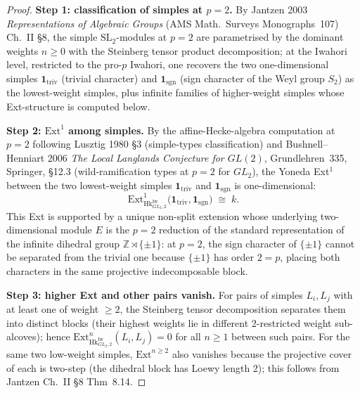 \begin{proof}
\medskip\noindent\textbf{Step 1: classification of simples at \(p=2\).}
By Jantzen 2003 \emph{Representations of Algebraic Groups}
(AMS Math.~Surveys Monographs~107) Ch.~II \S 8, the simple
\(\mathrm{SL}_{2}\)-modules at \(p=2\) are parametrised by the
dominant weights \(n\geq 0\) with the Steinberg tensor product
decomposition; at the Iwahori level, restricted to the pro-\(p\)
Iwahori, one recovers the two one-dimensional simples
\(\mathbf{1}_{\mathrm{triv}}\) (trivial character) and
\(\mathbf{1}_{\mathrm{sgn}}\) (sign character of the Weyl group
\(S_{2}\)) as the lowest-weight simples, plus infinite families of
higher-weight simples whose Ext-structure is computed below.

\medskip\noindent\textbf{Step 2: \(\mathrm{Ext}^{1}\) among simples.} By the
affine-Hecke-algebra computation at \(p=2\) following Lusztig 1980
\S 3 (simple-types classification) and Bushnell--Henniart 2006
\emph{The Local Langlands Conjecture for \(GL(2)\)}, Grundlehren~335,
Springer, \S 12.3 (wild-ramification types at \(p=2\) for \(GL_{2}\)),
the Yoneda Ext\({}^{1}\) between the two lowest-weight simples
\(\mathbf{1}_{\mathrm{triv}}\) and \(\mathbf{1}_{\mathrm{sgn}}\) is
one-dimensional:
\begin{equation}
\mathrm{Ext}^{1}_{\mathrm{Hk}^{\mathrm{Iw}}_{GL_{2},2}}\bigl(\mathbf{1}_{\mathrm{triv}},\mathbf{1}_{\mathrm{sgn}}\bigr)
\;\cong\;k.
\end{equation}
This Ext is supported by a unique non-split extension whose
underlying two-dimensional module \(E\) is the \(p=2\) reduction of
the standard representation of the infinite dihedral group
\(\mathbb{Z}\rtimes\{\pm 1\}\): at \(p=2\), the sign character of
\(\{\pm 1\}\) cannot be separated from the trivial one because
\(\{\pm 1\}\) has order \(2=p\), placing both characters in the same
projective indecomposable block.

\medskip\noindent\textbf{Step 3: higher Ext and other pairs vanish.}
For pairs of simples \(L_{i},L_{j}\) with at least one of weight
\(\geq 2\), the Steinberg tensor decomposition separates them into
distinct blocks (their highest weights lie in different
\(2\)-restricted weight sub-alcoves); hence
\(\mathrm{Ext}^{n}_{\mathrm{Hk}^{\mathrm{Iw}}_{GL_{2},2}}(L_{i},L_{j})=0\)
for all \(n\geq 1\) between such pairs. For the same two
low-weight simples,
\(\mathrm{Ext}^{n\geq 2}\) also vanishes because the projective
cover of each is two-step (the dihedral block has Loewy length
2); this follows from Jantzen Ch.~II \S 8 Thm~8.14.


\end{proof}
